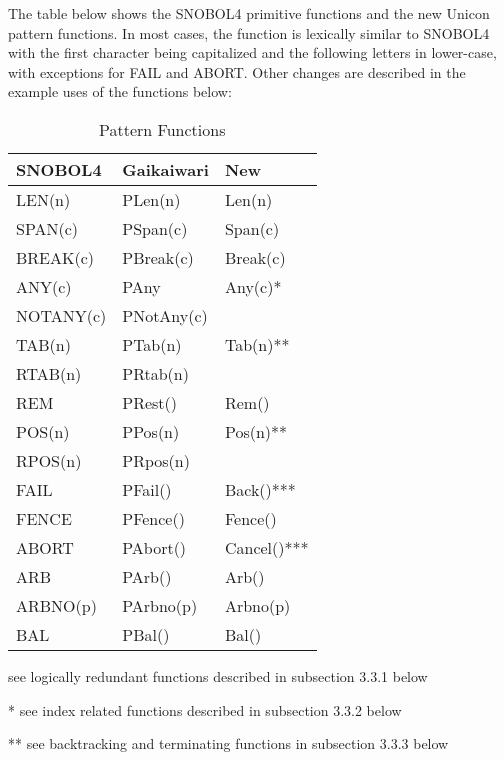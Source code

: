 \documentclass{article}
\begin{document}
The table below shows the SNOBOL4 primitive functions and the new Unicon pattern functions.  In most cases, the function is lexically similar to SNOBOL4 with the first character being capitalized and the following letters in lower-case, with exceptions for FAIL and ABORT.  Other changes are described in the example uses of the functions below: 

\begin{table}[ht]
	\begin{threeparttable}
		\caption{Pattern Functions}
		\centering
		\begin{tabular}{|l|l|l|}
			\hline\hline
			SNOBOL4 & Gaikaiwari & New \\
			\hline
			LEN(n) & PLen(n) & Len(n) \\
			SPAN(c) & PSpan(c) & Span(c)  \\
			BREAK(c) & PBreak(c) & Break(c) \\
			ANY(c) & PAny & Any(c)* \\
			NOTANY(c) & PNotAny(c) &  \\
			TAB(n) & PTab(n) & Tab(n)** \\
			RTAB(n) & PRtab(n) &  \\
			REM & PRest() & Rem() \\
			POS(n) & PPos(n) & Pos(n)**  \\
			RPOS(n) & PRpos(n) &  \\
			FAIL & PFail() & Back()*** \\
			FENCE & PFence() & Fence() \\
			ABORT & PAbort() & Cancel()*** \\
			ARB & PArb() & Arb() \\
			ARBNO(p) & PArbno(p) & Arbno(p) \\
			BAL & PBal() & Bal() \\
			\hline
		\end{tabular}
		
		\begin{tablenotes}
      		\small
      		\item * see logically redundant functions described in subsection 3.3.1 below
      		\item ** see index related functions described in subsection 3.3.2 below
      		\item *** see backtracking and terminating functions in subsection 3.3.3 below
      	\end{tablenotes}
	\end{threeparttable}
\end{table}
\end{document}
